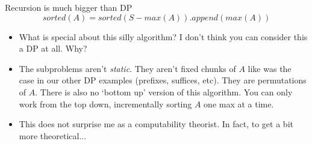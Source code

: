 \documentclass{beamer}
\begin{document}
\begin{frame}{Recursion is much bigger than DP}
    \[ sorted(A) = sorted(S-max(A)).append(max(A)) \]
    \begin{itemize}
        \item What is special about this silly algorithm? I don't think you can consider this a DP at all. Why? \pause 
        \item The subproblems aren't \emph{static}. They aren't fixed chunks of $A$ like was the case in our other DP examples (prefixes, suffices, etc). They are permutations of $A$. There is also no `bottom up' version of this algorithm. You can only work from the top down, incrementally sorting $A$ one max at a time. \pause 
        \item This does not surprise me as a computability theorist. In fact, to get a bit more theoretical...
    \end{itemize}
\end{frame}
\end{document}
